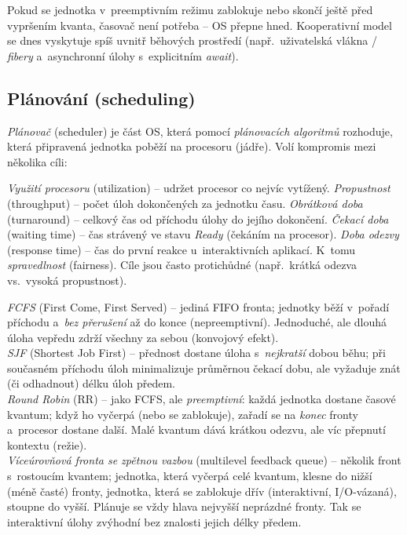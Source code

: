 \begin{poznamka}
Pokud se jednotka v~preemptivním režimu zablokuje nebo skončí ještě před vypršením kvanta, časovač není potřeba -- OS přepne hned. Kooperativní model se dnes vyskytuje spíš uvnitř běhových prostředí (např.\ uživatelská vlákna / \emph{fibery} a~asynchronní úlohy s~explicitním \emph{await}).
\end{poznamka}

\subsection{Plánování (scheduling)}

\emph{Plánovač} (scheduler) je část OS, která pomocí \emph{plánovacích algoritmů} rozhoduje, která připravená jednotka poběží na procesoru (jádře). Volí kompromis mezi několika cíli:

\begin{definice}
\emph{Využití procesoru} (utilization) -- udržet procesor co nejvíc vytížený. \emph{Propustnost} (throughput) -- počet úloh dokončených za jednotku času. \emph{Obrátková doba} (turnaround) -- celkový čas od příchodu úlohy do jejího dokončení. \emph{Čekací doba} (waiting time) -- čas strávený ve stavu \emph{Ready} (čekáním na procesor). \emph{Doba odezvy} (response time) -- čas do první reakce u~interaktivních aplikací. K~tomu \emph{spravedlnost} (fairness). Cíle jsou často protichůdné (např.\ krátká odezva vs.\ vysoká propustnost).
\end{definice}

\begin{definice}
\emph{FCFS} (First Come, First Served) -- jediná FIFO fronta; jednotky běží v~pořadí příchodu a~\emph{bez přerušení} až do konce (nepreemptivní). Jednoduché, ale dlouhá úloha vepředu zdrží všechny za sebou (konvojový efekt).\\
\emph{SJF} (Shortest Job First) -- přednost dostane úloha s~\emph{nejkratší} dobou běhu; při současném příchodu úloh minimalizuje průměrnou čekací dobu, ale vyžaduje znát (či odhadnout) délku úloh předem.\\
\emph{Round Robin} (RR) -- jako FCFS, ale \emph{preemptivní}: každá jednotka dostane časové kvantum; když ho vyčerpá (nebo se zablokuje), zařadí se na \emph{konec} fronty a~procesor dostane další. Malé kvantum dává krátkou odezvu, ale víc přepnutí kontextu (režie).\\
\emph{Víceúrovňová fronta se zpětnou vazbou} (multilevel feedback queue) -- několik front s~rostoucím kvantem; jednotka, která vyčerpá celé kvantum, klesne do nižší (méně časté) fronty, jednotka, která se zablokuje dřív (interaktivní, I/O-vázaná), stoupne do vyšší. Plánuje se vždy hlava nejvyšší neprázdné fronty. Tak se interaktivní úlohy zvýhodní bez znalosti jejich délky předem.
\end{definice}


